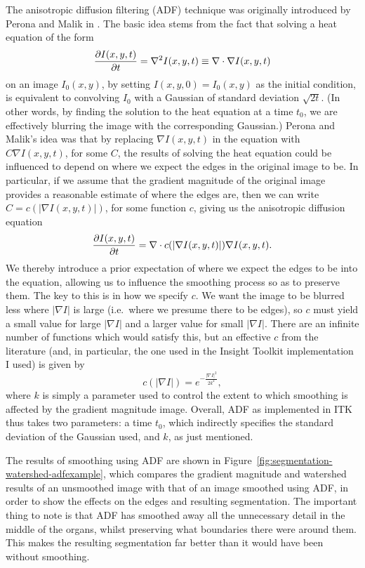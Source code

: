 The anisotropic diffusion filtering (ADF) technique was originally introduced by Perona and Malik in \cite{perona90}. The basic idea stems from the fact that solving a heat equation of the form
%
\[
\frac{\partial I(x,y,t)}{\partial t} = \nabla^2 I(x,y,t) \equiv \nabla \cdot \nabla I(x,y,t)
\]
%
on an image $I_0(x,y)$, by setting $I(x,y,0) = I_0(x,y)$ as the initial condition, is equivalent to convolving $I_0$ with a Gaussian of standard deviation $\sqrt{2t}$. (In other words, by finding the solution to the heat equation at a time $t_0$, we are effectively blurring the image with the corresponding Gaussian.) Perona and Malik's idea was that by replacing $\nabla I(x,y,t)$ in the equation with $C \nabla I(x,y,t)$, for some $C$, the results of solving the heat equation could be influenced to depend on where we expect the edges in the original image to be. In particular, if we assume that the gradient magnitude of the original image provides a reasonable estimate of where the edges are, then we can write $C = c(|\nabla I(x,y,t)|)$, for some function $c$, giving us the anisotropic diffusion equation
%
\[
\frac{\partial I(x,y,t)}{\partial t} = \nabla \cdot c(|\nabla I(x,y,t)|) \nabla I(x,y,t).
\]
%
We thereby introduce a prior expectation of where we expect the edges to be into the equation, allowing us to influence the smoothing process so as to preserve them. The key to this is in how we specify $c$. We want the image to be blurred less where $|\nabla I|$ is large (i.e.~where we presume there to be edges), so $c$ must yield a small value for large $|\nabla I|$ and a larger value for small $|\nabla I|$. There are an infinite number of functions which would satisfy this, but an effective $c$ from the literature (and, in particular, the one used in the Insight Toolkit \cite{itk} implementation I used) is given by
%
\[
c(|\nabla I|) = e^{-\frac{|\nabla I|^2}{2k^2}},
\]
%
where $k$ is simply a parameter used to control the extent to which smoothing is affected by the gradient magnitude image. Overall, ADF as implemented in ITK thus takes two parameters: a time $t_0$, which indirectly specifies the standard deviation of the Gaussian used, and $k$, as just mentioned.

\enlargethispage*{\baselineskip}

The results of smoothing using ADF are shown in Figure~\ref{fig:segmentation-watershed-adfexample}, which compares the gradient magnitude and watershed results of an unsmoothed image with that of an image smoothed using ADF, in order to show the effects on the edges and resulting segmentation. The important thing to note is that ADF has smoothed away all the unnecessary detail in the middle of the organs, whilst preserving what boundaries there were around them. This makes the resulting segmentation far better than it would have been without smoothing.

